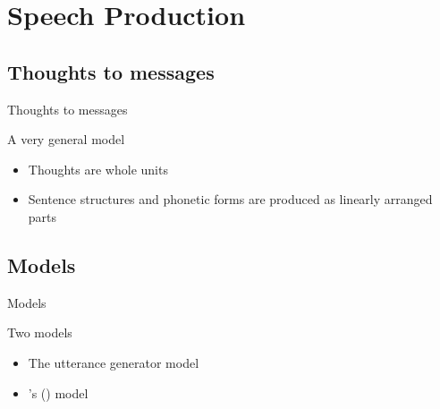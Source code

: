 \documentclass{beamer}
\subtitle[Speech Production]{Speech Production}
\newcommand{\suboneone}{Thoughts to messages}
\newcommand{\subonetwo}{Models}
\begin{document}
  

  \section{Speech Production}
    \subsection{\suboneone}
      \begin{frame}{\suboneone}
        \begin{block}{A very general model}
        \end{block}
        \begin{block}{}
          \begin{itemize}
            \item Thoughts are whole units
            \item Sentence structures and phonetic forms are produced as linearly arranged parts
          \end{itemize}
        \end{block}
      \end{frame}

    \subsection{\subonetwo}
      \begin{frame}{\subonetwo}
        \begin{block}{Two models}
          \begin{itemize}
            \item The utterance generator model \parencite{fromkin_non-anomalous_1971}
            \item \citeauthor{levelt_speaking:_1989}'s (\citeyear{levelt_speaking:_1989}) model
          \end{itemize}
        \end{block}
      \end{frame}
\end{document}
